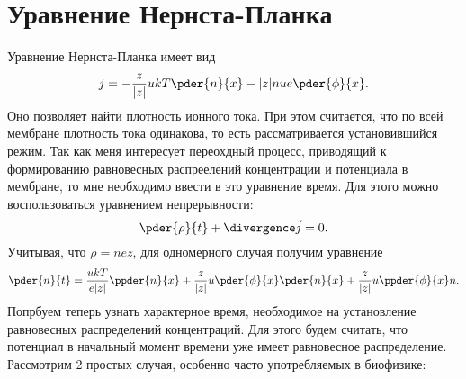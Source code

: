 \documentclass{hedwork}
\begin{document}
\section{Уравнение Нернста-Планка}
    Уравнение Нернста-Планка имеет вид
    \begin{equation}
        j = -\frac{z}{|z|}ukT\pder{n}{x} - |z|nue\pder{\phi}{x}.
        \label{eq:nernst-plank}
    \end{equation}
    Оно позволяет найти плотность ионного тока. При этом считается, что по всей
    мембране плотность тока одинакова, то есть рассматривается установившийся
    режим. Так как меня интересует переохдный процесс, приводящий к формированию
    равновесных распреелений концентрации и потенциала в мембране, то мне
    необходимо ввести в это уравнение время. Для этого можно воспользоваться
    уравнением непрерывности:
    \begin{equation}
        \pder{\rho}{t} + \divergence\vec{j} = 0.
    \end{equation}
    Учитывая, что \( \rho = nez \), для одномерного случая получим уравнение
    \begin{equation}
        \pder{n}{t} = \frac{ukT}{e|z|}\ppder{n}{x} +
            \frac{z}{|z|}u\pder{\phi}{x}\pder{n}{x} +
            \frac{z}{|z|}u\ppder{\phi}{x}n.
        \label{eq:nernst-plank_with_time}
    \end{equation}
    Попрбуем теперь узнать характерное время, необходимое на установление
    равновесных распределений концентраций. Для этого будем считать, что
    потенциал в начальный момент времени уже имеет равновесное
    распределение. Рассмотрим 2 простых случая, особенно часто употребляемых в
    биофизике:
\end{document}
